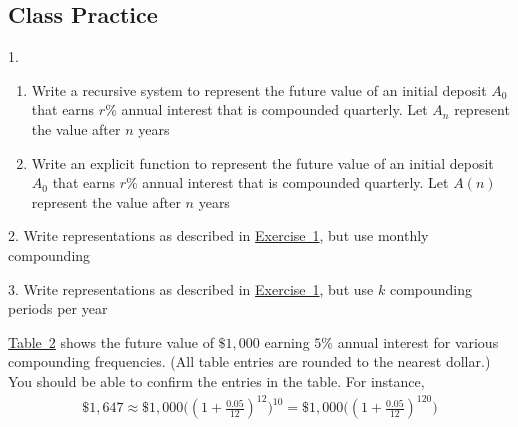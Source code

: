 \documentclass[10pt,]{book}
\theoremstyle{plain}
\theoremstyle{definition}
\theoremstyle{definition}
\theoremstyle{definition}
\numberwithin{equation}{section}
\begin{document}
\subsection[{Class Practice}]{Class Practice}\label{exercises-7}
\begin{exerciselist}
\item[1.]\hypertarget{chapter04-section05-classpractice-recursive-vs-explicit}{}\leavevmode%
\begin{enumerate}[label=(\alph*)]
\item\hypertarget{li-105}{}Write a recursive system to represent the future value of an initial deposit \(A_0\) that earns \(r\%\) annual interest that is compounded quarterly. Let \(A_n\) represent the value after \(n\) years%
\item\hypertarget{li-106}{}Write an explicit function to represent the future value of an initial deposit \(A_0\) that earns \(r\%\) annual interest that is compounded quarterly. Let \(A(n)\) represent the value after \(n\) years%
\end{enumerate}
\par\smallskip
\item[2.]\hypertarget{exercise-48}{}\hypertarget{p-206}{}%
Write representations as described in \hyperlink{chapter04-section05-classpractice-recursive-vs-explicit}{Exercise~1}, but use monthly compounding%
\par\smallskip
\item[3.]\hypertarget{exercise-49}{}\hypertarget{p-207}{}%
Write representations as described in \hyperlink{chapter04-section05-classpractice-recursive-vs-explicit}{Exercise~1}, but use \(k\) compounding periods per year%
\par\smallskip
\end{exerciselist}
\hypertarget{p-208}{}%
\hyperref[impact-of-compounding-table]{Table~2} shows the future value of \(\$1,000\) earning \(5\%\) annual interest for various compounding frequencies. (All table entries are rounded to the nearest dollar.) You should be able to confirm the entries in the table.  For instance,%
%
\begin{gather*}
\$1,647 \approx \$1,000 \bigg( ( 1 + \frac{0.05}{12}) ^{12} \bigg)^{10} = \$1,000 \bigg( ( 1 + \frac{0.05}{12})^{120}\bigg)
\end{gather*}
\end{document}
